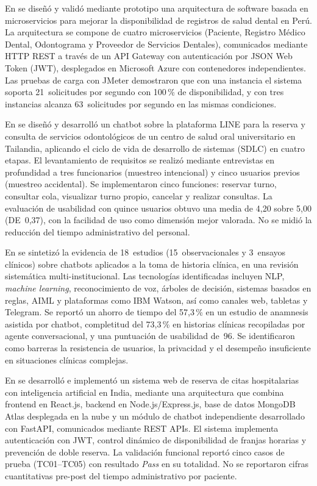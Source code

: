 En \cite{arcila2022microservice} se diseñó y validó mediante prototipo una arquitectura
de software basada en microservicios para mejorar la disponibilidad de registros de
salud dental en Perú. La arquitectura se compone de cuatro microservicios (Paciente,
Registro Médico Dental, Odontograma y Proveedor de Servicios Dentales), comunicados
mediante HTTP REST a través de un API Gateway con autenticación por JSON Web Token
(JWT), desplegados en Microsoft Azure con contenedores independientes. Las pruebas de
carga con JMeter demostraron que con una instancia el sistema soporta 21~solicitudes
por segundo con 100\,\% de disponibilidad, y con tres instancias alcanza
63~solicitudes por segundo en las mismas condiciones.

En \cite{hmadchayyapum2025line} se diseñó y desarrolló un chatbot sobre la plataforma
LINE para la reserva y consulta de servicios odontológicos de un centro de salud oral
universitario en Tailandia, aplicando el ciclo de vida de desarrollo de sistemas (SDLC)
en cuatro etapas. El levantamiento de requisitos se realizó mediante entrevistas en
profundidad a tres funcionarios (muestreo intencional) y cinco usuarios previos
(muestreo accidental). Se implementaron cinco funciones: reservar turno, consultar
cola, visualizar turno propio, cancelar y realizar consultas. La evaluación de
usabilidad con quince usuarios obtuvo una media de 4{,}20 sobre 5{,}00 (DE~0{,}37),
con la facilidad de uso como dimensión mejor valorada. No se midió la reducción del
tiempo administrativo del personal.

En \cite{hindelang2024chatbots} se sintetizó la evidencia de 18~estudios
(15~observacionales y 3~ensayos clínicos) sobre chatbots aplicados a la toma de
historia clínica, en una revisión sistemática multi-institucional. Las tecnologías
identificadas incluyen NLP, \textit{machine learning}, reconocimiento de voz, árboles
de decisión, sistemas basados en reglas, AIML y plataformas como IBM Watson, así como
canales web, tabletas y Telegram. Se reportó un ahorro de tiempo del 57{,}3\,\% en un
estudio de anamnesis asistida por chatbot, completitud del 73{,}3\,\% en historias
clínicas recopiladas por agente conversacional, y una puntuación de usabilidad de~96.
Se identificaron como barreras la resistencia de usuarios, la privacidad y el
desempeño insuficiente en situaciones clínicas complejas.

En \cite{shaikh2026smartmedibook} se desarrolló e implementó un sistema web de reserva
de citas hospitalarias con inteligencia artificial en India, mediante una arquitectura
que combina frontend en React.js, backend en Node.js/Express.js, base de datos
MongoDB Atlas desplegada en la nube y un módulo de chatbot independiente desarrollado
con FastAPI, comunicados mediante REST APIs. El sistema implementa autenticación con
JWT, control dinámico de disponibilidad de franjas horarias y prevención de doble
reserva. La validación funcional reportó cinco casos de prueba (TC01--TC05) con
resultado \textit{Pass} en su totalidad. No se reportaron cifras cuantitativas
pre-post del tiempo administrativo por paciente.

